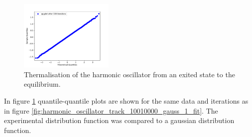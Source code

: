 \documentclass{scrartcl}
\begin{document}
\begin{figure}[H]
			\includegraphics[width=0.4\textwidth]{../imgs/harmonic_oscillator_track/track_10010000_qq_100.pdf}
			\caption{Thermalisation of the harmonic oscillator from an exited state to the equilibrium.}
			\label{fig:harmonic_oscillator_track_track_10010000_qqs}
		\end{figure}
		In figure \ref{fig:harmonic_oscillator_track_track_10010000_qqs} quantile-quantile plots are shown for the same data and iterations as in figure \ref{fig:harmonic_oscillator_track_10010000_gauss_1_fit}.
		The experimental distribution function was compared to a gaussian distribution function.
\end{document}

